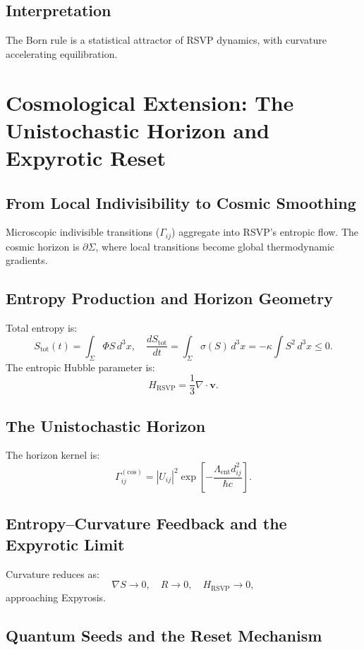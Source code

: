 \documentclass[12pt]{article}
\begin{document}
\subsection{Interpretation}

The Born rule is a statistical attractor of RSVP dynamics, with curvature accelerating equilibration.

\section{Cosmological Extension: The Unistochastic Horizon and Expyrotic Reset}

\subsection{From Local Indivisibility to Cosmic Smoothing}

Microscopic indivisible transitions (\(\Gamma_{ij}\)) aggregate into RSVP’s entropic flow. The cosmic horizon is \(\partial \Sigma\), where local transitions become global thermodynamic gradients.

\subsection{Entropy Production and Horizon Geometry}

Total entropy is:
\[
S_{\text{tot}}(t) = \int_\Sigma \Phi S \, d^3x, \quad \frac{d S_{\text{tot}}}{dt} = \int_\Sigma \sigma(S) \, d^3x = -\kappa \int S^2 \, d^3x \leq 0.
\]
The entropic Hubble parameter is:
\[
H_{\mathrm{RSVP}} = \frac{1}{3} \nabla \cdot \mathbf{v}.
\]

\subsection{The Unistochastic Horizon}

The horizon kernel is:
\[
\Gamma_{ij}^{(\mathrm{cos})} = |U_{ij}|^2 \exp\left[ -\frac{\Lambda_{\mathrm{ent}} d_{ij}^2}{\hbar c} \right].
\]

\subsection{Entropy–Curvature Feedback and the Expyrotic Limit}

Curvature reduces as:
\[
\nabla S \to 0, \quad R \to 0, \quad H_{\mathrm{RSVP}} \to 0,
\]
approaching Expyrosis.

\subsection{Quantum Seeds and the Reset Mechanism}
\end{document}
